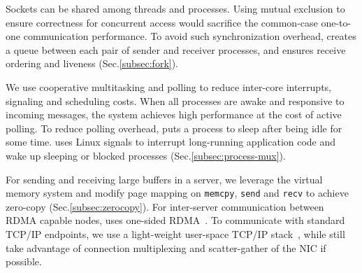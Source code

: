 Sockets can be shared among threads and processes. Using mutual exclusion to ensure correctness for concurrent access would sacrifice the common-case one-to-one communication performance. To avoid such synchronization overhead, \sys creates a queue between each pair of sender and receiver processes, and ensures receive ordering and liveness (Sec.\ref{subsec:fork}).

We use cooperative multitasking and polling to reduce inter-core interrupts, signaling and scheduling costs. When all processes are awake and responsive to incoming messages, the system achieves high performance at the cost of active polling. To reduce polling overhead, \sys puts a process to sleep after being idle for some time. \sys uses Linux signals to interrupt long-running application code and wake up sleeping or blocked processes (Sec.\ref{subsec:process-mux}). 

For sending and receiving large buffers in a server, we leverage the virtual memory system and modify page mapping on \texttt{memcpy}, \texttt{send} and \texttt{recv} to achieve zero-copy (Sec.\ref{subsec:zerocopy}). For inter-server communication between RDMA capable nodes, \sys uses one-sided RDMA~\cite{mitchell2013using,kaminsky2016design}. To communicate with standard TCP/IP endpoints, we use a light-weight user-space TCP/IP stack~\cite{dunkels2001design}, while still take advantage of connection multiplexing and scatter-gather of the NIC if possible. %





